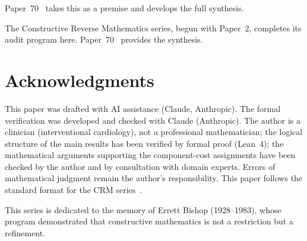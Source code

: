 \documentclass[11pt]{article}
\theoremstyle{plain}
\theoremstyle{definition}
\theoremstyle{remark}
\begin{document}
\noindent
Paper~70~\cite{Paper70} takes this as a premise and develops the full synthesis.

\bigskip

The Constructive Reverse Mathematics series, begun with Paper~2, completes its
audit program here. Paper~70~\cite{Paper70} provides the synthesis.

\section*{Acknowledgments}

This paper was drafted with AI assistance (Claude, Anthropic).
The formal verification was developed and checked with Claude
(Anthropic).  The author is a clinician (interventional
cardiology), not a professional mathematician; the logical structure
of the main results has been verified by formal proof (Lean~4); the
mathematical arguments supporting the component-cost assignments have been
checked by the author and by consultation with domain experts.
Errors of mathematical judgment remain the author's responsibility.
This paper follows the standard format for the CRM
series~\cite{format-guide}.

This series is dedicated to the memory of Errett Bishop (1928--1983),
whose program demonstrated that constructive mathematics is not a
restriction but a refinement.
\end{document}
